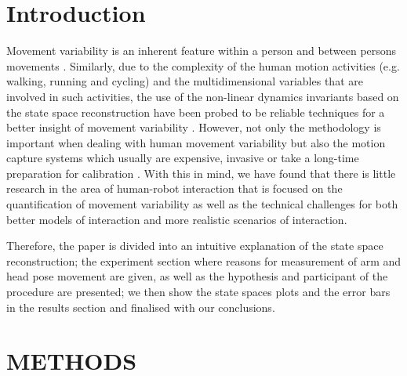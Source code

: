 \documentclass{sigchi}
\def\plainkeywords{Authors' choice; of terms; separated; by
  semicolons; include commas, within terms only; required.}
\begin{document}



\section{Introduction}
Movement variability is an inherent feature within a person and between persons
movements \cite{newell1993variability}. Similarly, due to the complexity of
the human motion activities (e.g. walking, running and cycling) and the
multidimensional variables that are involved in such activities,
the use of the non-linear dynamics invariants based on the state space
reconstruction have been probed to be reliable techniques for a better insight of
movement variability \cite{Frank2010,QuintanaDuque2012,Sama2013}.
However, not only the methodology is important when dealing with human movement
variability but also the motion capture systems which usually are expensive,
invasive or take a long-time preparation for calibration
\cite{Baltrusaitis2016,Lemaignan2016}.
With this in mind, we have found that there is little research in the area of
human-robot interaction that is focused on the quantification of movement variability
as well as the technical challenges for both
better models of interaction and more realistic scenarios of interaction.

Therefore, the paper is divided into an intuitive explanation of the state space reconstruction;
the experiment section where reasons for measurement of arm and head pose
movement are given,
as well as the hypothesis and participant of the procedure are presented;
we then show the state spaces plots and the error bars in the results section and
finalised with our conclusions.




\section{METHODS}
\end{document}
